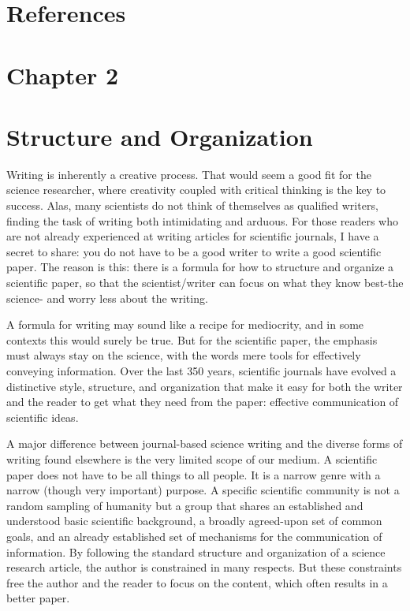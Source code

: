 \section*{References}
\section*{Chapter 2}
\section*{Structure and Organization}
Writing is inherently a creative process. That would seem a good fit for the science researcher, where creativity coupled with critical thinking is the key to success. Alas, many scientists do not think of themselves as qualified writers, finding the task of writing both intimidating and arduous. For those readers who are not already experienced at writing articles for scientific journals, I have a secret to share: you do not have to be a good writer to write a good scientific paper. The reason is this: there is a formula for how to structure and organize a scientific paper, so that the scientist/writer can focus on what they know best-the science- and worry less about the writing.

A formula for writing may sound like a recipe for mediocrity, and in some contexts this would surely be true. But for the scientific paper, the emphasis must always stay on the science, with the words mere tools for effectively conveying information. Over the last 350 years, scientific journals have evolved a distinctive style, structure, and organization that make it easy for both the writer and the reader to get what they need from the paper: effective communication of scientific ideas.

A major difference between journal-based science writing and the diverse forms of writing found elsewhere is the very limited scope of our medium. A scientific paper does not have to be all things to all people. It is a narrow genre with a narrow (though very important) purpose. A specific scientific community is not a random sampling of humanity but a group that shares an established and understood basic scientific background, a broadly agreed-upon set of common goals, and an already established set of mechanisms for the communication of information. By following the standard structure and organization of a science research article, the author is constrained in many respects. But these constraints free the author and the reader to focus on the content, which often results in a better paper.

